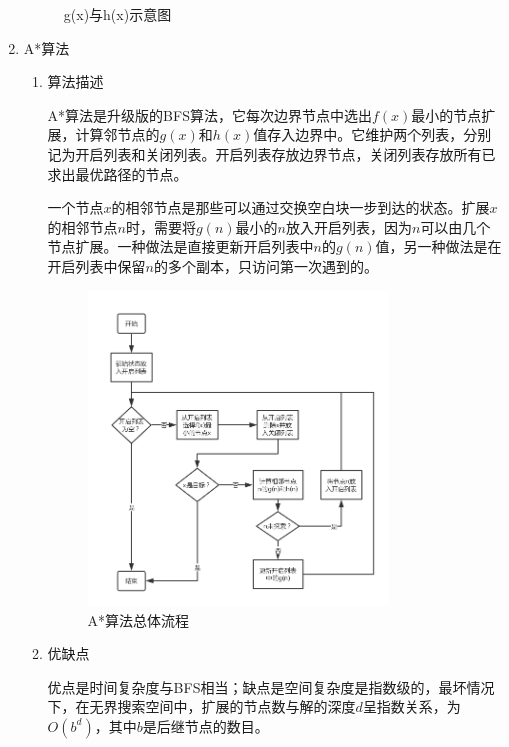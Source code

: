 \documentclass[10pt,letterpaper]{ctexart}
\begin{document}
\begin{enumerate}[itemindent=2.5em,label=\arabic*、]
\begin{figure}[H]
    \caption{g(x)与h(x)示意图}
    \label{fig:informed}
    \end{figure}
    \item A*算法
    \begin{enumerate}[itemindent=1.5em,label=（\arabic*）]
      \item 算法描述
      \par \qquad A*算法是升级版的BFS算法，它每次边界节点中选出$f(x)$最小的节点扩展，计算邻节点的$g(x)$和$h(x)$值存入边界中。它维护两个列表，分别记为开启列表和关闭列表。开启列表存放边界节点，关闭列表存放所有已求出最优路径的节点。
      \par \qquad 一个节点$x$的相邻节点是那些可以通过交换空白块一步到达的状态。扩展$x$的相邻节点$n$时，需要将$g(n)$最小的$n$放入开启列表，因为$n$可以由几个节点扩展。一种做法是直接更新开启列表中$n$的$g(n)$值，另一种做法是在开启列表中保留$n$的多个副本，只访问第一次遇到的。
      \begin{figure}[H]
      \centering
      \includegraphics[width=0.8\textwidth]{astar.png}
      \caption{A*算法总体流程}
      \label{fig:astar}
      \end{figure}
      \item 优缺点
      \par \qquad 优点是时间复杂度与BFS相当；缺点是空间复杂度是指数级的，最坏情况下，在无界搜索空间中，扩展的节点数与解的深度$d$呈指数关系，为$O(b^d)$，其中$b$是后继节点的数目。
    \end{enumerate}


\end{enumerate}
\end{document}
